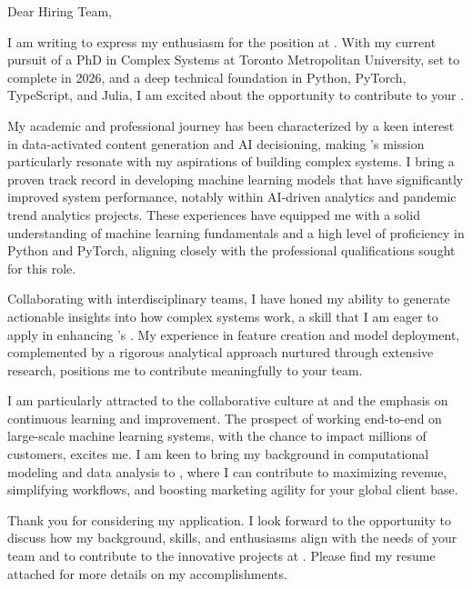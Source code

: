 Dear \company{} Hiring Team,
\vspace{1.0em}

\hspace{1.5em} I am writing to express my enthusiasm for the \position position at \company. With my current pursuit of a PhD in Complex Systems at Toronto Metropolitan University, set to complete in 2026, and a deep technical foundation in Python, PyTorch, TypeScript, and Julia, I am excited about the opportunity to contribute to your \team.
\vspace{1.0em}

\hspace{1.5em} My academic and professional journey has been characterized by a keen interest in data-activated content generation and AI decisioning, making \company’s mission particularly resonate with my aspirations of building complex systems. I bring a proven track record in developing machine learning models that have significantly improved system performance, notably within AI-driven analytics and pandemic trend analytics projects. These experiences have equipped me with a solid understanding of machine learning fundamentals and a high level of proficiency in Python and PyTorch, aligning closely with the professional qualifications sought for this role.
\vspace{1.0em}

\hspace{1.5em} Collaborating with interdisciplinary teams, I have honed my ability to generate actionable insights into how complex systems work, a skill that I am eager to apply in enhancing \company’s \product. My experience in feature creation and model deployment, complemented by a rigorous analytical approach nurtured through extensive research, positions me to contribute meaningfully to your team.
\vspace{1.0em}

\hspace{1.5em} I am particularly attracted to the collaborative culture at \company{} and the emphasis on continuous learning and improvement. The prospect of working end-to-end on large-scale machine learning systems, with the chance to impact millions of customers, excites me. I am keen to bring my background in computational modeling and data analysis to \company, where I can contribute to maximizing revenue, simplifying workflows, and boosting marketing agility for your global client base.
\vspace{1.0em}

\hspace{1.5em} Thank you for considering my application. I look forward to the opportunity to discuss how my background, skills, and enthusiasms align with the needs of your team and to contribute to the innovative projects at \company. Please find my resume attached for more details on my accomplishments.
\vspace{1.0em}


